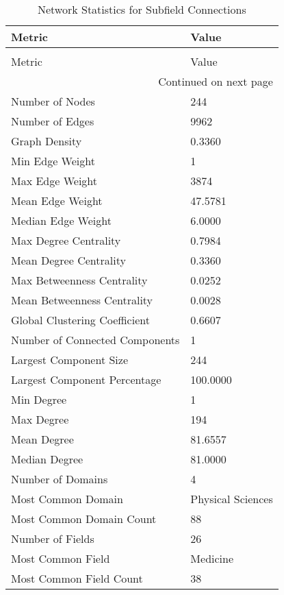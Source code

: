 \begin{longtable}{ll}
\caption{Network Statistics for Subfield Connections} \label{tab:subfield_connections_stats} \\
\toprule
Metric & Value \\
\midrule
\endfirsthead
\caption[]{Network Statistics for Subfield Connections} \\
\toprule
Metric & Value \\
\midrule
\endhead
\midrule
\multicolumn{2}{r}{Continued on next page} \\
\midrule
\endfoot
\bottomrule
\endlastfoot
Number of Nodes & 244 \\
Number of Edges & 9962 \\
Graph Density & 0.3360 \\
Min Edge Weight & 1 \\
Max Edge Weight & 3874 \\
Mean Edge Weight & 47.5781 \\
Median Edge Weight & 6.0000 \\
Max Degree Centrality & 0.7984 \\
Mean Degree Centrality & 0.3360 \\
Max Betweenness Centrality & 0.0252 \\
Mean Betweenness Centrality & 0.0028 \\
Global Clustering Coefficient & 0.6607 \\
Number of Connected Components & 1 \\
Largest Component Size & 244 \\
Largest Component Percentage & 100.0000 \\
Min Degree & 1 \\
Max Degree & 194 \\
Mean Degree & 81.6557 \\
Median Degree & 81.0000 \\
Number of Domains & 4 \\
Most Common Domain & Physical Sciences \\
Most Common Domain Count & 88 \\
Number of Fields & 26 \\
Most Common Field & Medicine \\
Most Common Field Count & 38 \\
\end{longtable}
